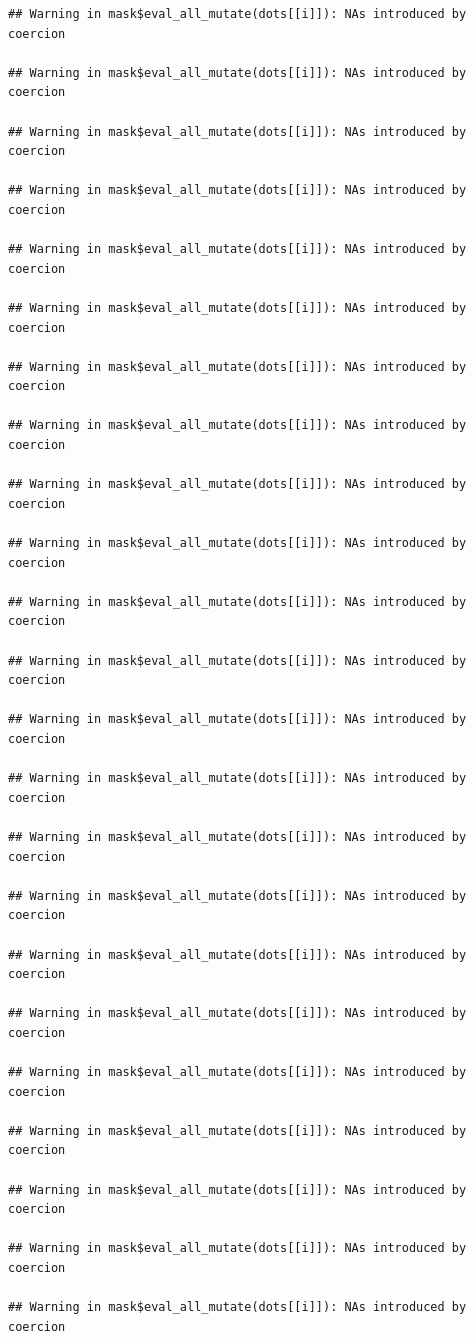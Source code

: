 \documentclass[
]{book}
\begin{document}
\begin{verbatim}
## Warning in mask$eval_all_mutate(dots[[i]]): NAs introduced by coercion

## Warning in mask$eval_all_mutate(dots[[i]]): NAs introduced by coercion

## Warning in mask$eval_all_mutate(dots[[i]]): NAs introduced by coercion

## Warning in mask$eval_all_mutate(dots[[i]]): NAs introduced by coercion

## Warning in mask$eval_all_mutate(dots[[i]]): NAs introduced by coercion

## Warning in mask$eval_all_mutate(dots[[i]]): NAs introduced by coercion

## Warning in mask$eval_all_mutate(dots[[i]]): NAs introduced by coercion

## Warning in mask$eval_all_mutate(dots[[i]]): NAs introduced by coercion

## Warning in mask$eval_all_mutate(dots[[i]]): NAs introduced by coercion

## Warning in mask$eval_all_mutate(dots[[i]]): NAs introduced by coercion

## Warning in mask$eval_all_mutate(dots[[i]]): NAs introduced by coercion

## Warning in mask$eval_all_mutate(dots[[i]]): NAs introduced by coercion

## Warning in mask$eval_all_mutate(dots[[i]]): NAs introduced by coercion

## Warning in mask$eval_all_mutate(dots[[i]]): NAs introduced by coercion

## Warning in mask$eval_all_mutate(dots[[i]]): NAs introduced by coercion

## Warning in mask$eval_all_mutate(dots[[i]]): NAs introduced by coercion

## Warning in mask$eval_all_mutate(dots[[i]]): NAs introduced by coercion

## Warning in mask$eval_all_mutate(dots[[i]]): NAs introduced by coercion

## Warning in mask$eval_all_mutate(dots[[i]]): NAs introduced by coercion

## Warning in mask$eval_all_mutate(dots[[i]]): NAs introduced by coercion

## Warning in mask$eval_all_mutate(dots[[i]]): NAs introduced by coercion

## Warning in mask$eval_all_mutate(dots[[i]]): NAs introduced by coercion

## Warning in mask$eval_all_mutate(dots[[i]]): NAs introduced by coercion


\end{verbatim}
\end{document}
